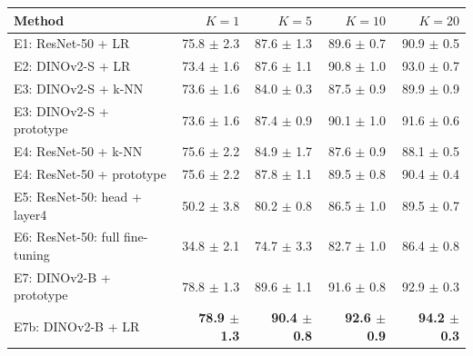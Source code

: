 \begin{tabular}{@{}lrrrr@{}}
\toprule
Method & $K=1$ & $K=5$ & $K=10$ & $K=20$ \\
\midrule
E1: ResNet-50 + LR & 75.8 $\pm$ 2.3 & 87.6 $\pm$ 1.3 & 89.6 $\pm$ 0.7 & 90.9 $\pm$ 0.5 \\
E2: DINOv2-S + LR & 73.4 $\pm$ 1.6 & 87.6 $\pm$ 1.1 & 90.8 $\pm$ 1.0 & 93.0 $\pm$ 0.7 \\
E3: DINOv2-S + k-NN & 73.6 $\pm$ 1.6 & 84.0 $\pm$ 0.3 & 87.5 $\pm$ 0.9 & 89.9 $\pm$ 0.9 \\
E3: DINOv2-S + prototype & 73.6 $\pm$ 1.6 & 87.4 $\pm$ 0.9 & 90.1 $\pm$ 1.0 & 91.6 $\pm$ 0.6 \\
E4: ResNet-50 + k-NN & 75.6 $\pm$ 2.2 & 84.9 $\pm$ 1.7 & 87.6 $\pm$ 0.9 & 88.1 $\pm$ 0.5 \\
E4: ResNet-50 + prototype & 75.6 $\pm$ 2.2 & 87.8 $\pm$ 1.1 & 89.5 $\pm$ 0.8 & 90.4 $\pm$ 0.4 \\
E5: ResNet-50: head + layer4 & 50.2 $\pm$ 3.8 & 80.2 $\pm$ 0.8 & 86.5 $\pm$ 1.0 & 89.5 $\pm$ 0.7 \\
E6: ResNet-50: full fine-tuning & 34.8 $\pm$ 2.1 & 74.7 $\pm$ 3.3 & 82.7 $\pm$ 1.0 & 86.4 $\pm$ 0.8 \\
E7: DINOv2-B + prototype & 78.8 $\pm$ 1.3 & 89.6 $\pm$ 1.1 & 91.6 $\pm$ 0.8 & 92.9 $\pm$ 0.3 \\
E7b: DINOv2-B + LR & \textbf{78.9 $\pm$ 1.3} & \textbf{90.4 $\pm$ 0.8} & \textbf{92.6 $\pm$ 0.9} & \textbf{94.2 $\pm$ 0.3} \\
\bottomrule
\end{tabular}
